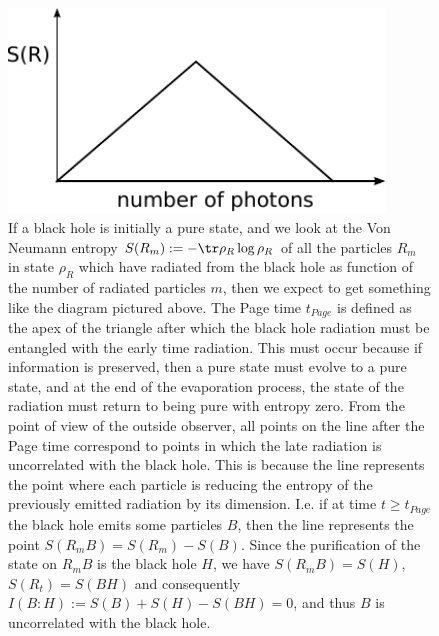 \documentclass[11pt,a4paper]{article}
\begin{document}
\begin{figure}
\includegraphics[width=10cm]{page3.pdf}
	\caption{	
	If a black hole is initially a pure state, and we look at the Von Neumann entropy $S(R_m):=-\tr\rho_R\log\rho_R$ of all the particles $R_m$ in state $\rho_R$ which have radiated from the black hole as function of the number of radiated particles $m$, then we expect to get something like the diagram pictured above\cite{page-unitary-evap}.  The Page time $t_{Page}$ is defined as the apex of the triangle after which the black hole radiation must be entangled with the early time radiation. This must occur because if information is preserved, then a pure state must evolve to a pure state, and at the end of the evaporation process, the state of the radiation must return to being pure with entropy zero. From the point of view of the outside observer, all points on the line after the Page time correspond to points in which the late radiation is uncorrelated with the black hole.  This is because the line represents the point where each particle is reducing the entropy of the previously emitted radiation by its dimension. I.e. if at time $t\geq t_{Page}$ the black hole emits some particles $B$, then the line represents the point $S(R_mB)=S(R_m)-S(B)$. Since the purification of the state on $R_mB$ is the black hole $H$, we have $S(R_mB)=S(H)$, $S(R_t)=S(BH)$ and consequently $I(B:H):=S(B)+S(H)-S(BH)=0$, and thus $B$ is uncorrelated with the black hole.  
	}
\label{fig:page}
\end{figure}
\end{document}

